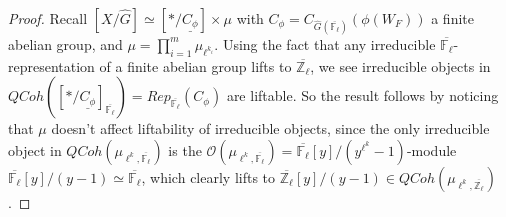 \documentclass{article}
\begin{document}
	\begin{proof}
		
		Recall $[X/\hat{G}] \simeq [*/\underline{C_\phi}] \times \mu$ with $C_\phi=C_{\hat{G}(\overline{\mathbb{F}_{\ell}})}(\phi(W_F))$ a finite abelian group, and $\mu=\prod_{i=1}^m\mu_{\ell^{k_i}}$. Using the fact that any irreducible $\overline{\mathbb{F}_{\ell}}$-representation of a finite abelian group lifts to $\overline{\mathbb{Z}_{\ell}}$, we see irreducible objects in $QCoh([*/\underline{C_\phi}]_{\overline{\mathbb{F}_{\ell}}})=Rep_{\overline{\mathbb{F}_{\ell}}}(C_\phi)$ are liftable. So the result follows by noticing that $\mu$ doesn't affect liftability of irreducible objects, since the only irreducible object in $QCoh(\mu_{\ell^{k}, \overline{\mathbb{F}_{\ell}}})$ is the $\mathcal{O}(\mu_{\ell^{k}, \overline{\mathbb{F}_{\ell}}})=\overline{\mathbb{F}_{\ell}}[y]/(y^{\ell^k}-1)$-module $\overline{\mathbb{F}_{\ell}}[y]/(y-1) \simeq \overline{\mathbb{F}_{\ell}}$, which clearly lifts to $\overline{\mathbb{Z}_{\ell}}[y]/(y-1) \in QCoh(\mu_{\ell^{k}, \overline{\mathbb{Z}_{\ell}}})$.
		
		
		
		
	\end{proof}
	
\end{document}
